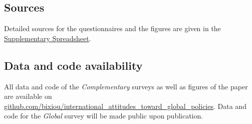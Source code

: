 \begin{small}
\subsection*{\small Sources}
Detailed sources for the questionnaires and the figures are given in the \href{https://github.com/bixiou/international_attitudes_toward_global_policies/raw/main/questionnaire/specificities.xlsx}{Supplementary Spreadsheet}.

\subsection*{\normalsize Data and code availability}

All data and code of the \textit{Complementary} surveys as well as figures of the paper are available on \href{https://github.com/bixiou/international_attitudes_toward_global_policies}{github.com/bixiou/international\_attitudes\_toward\_global\_policies}. Data and code for the \textit{Global} survey will be made public upon publication.

\end{small}  %

